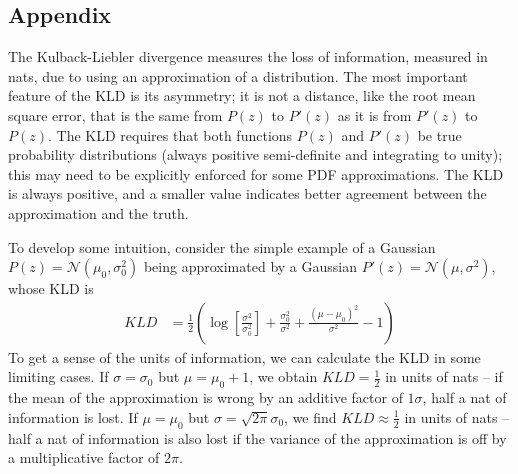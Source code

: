 \documentclass[\docopts]{\docclass}
\begin{document}
\subsection*{Appendix}
\label{sec:kld}

The Kulback-Liebler divergence measures the loss of information, measured in nats, due to using an
approximation of a distribution.  The most important feature of the KLD is its
asymmetry; it is not a distance, like the root mean square error, that is the
same from $P(z)$ to $P'(z)$ as it is from $P'(z)$ to $P(z)$.
The KLD requires that both functions $P(z)$ and $P'(z)$ be
true probability distributions (always positive semi-definite and integrating to
unity); this may need to be explicitly enforced for
some PDF approximations.  The KLD is always
positive, and a smaller value indicates better agreement between the
approximation and the truth.

To develop some intuition, consider the simple example of a Gaussian
$P(z)=\mathcal{N}(\mu_{0}, \sigma_{0}^{2})$ being approximated by a Gaussian
$P'(z)=\mathcal{N}(\mu, \sigma^{2})$, whose KLD is
\begin{align}
  \label{eq:gaussian}
  KLD &= \frac{1}{2}\left(\log\left[\frac{\sigma^{2}}{\sigma_{0}^{2}}\right] +
\frac{\sigma_{0}^{2}}{\sigma^{2}} + \frac{(\mu-\mu_{0})^{2}}{\sigma^{2}} -
1\right)
\end{align}
To get a sense of the units of information, we can calculate the KLD in some
limiting cases.  If $\sigma=\sigma_{0}$ but $\mu=\mu_{0}+1$, we obtain
$KLD=\frac{1}{2}$ in units of nats -- if the mean of the approximation is wrong
by an additive factor of $1\sigma$, half a nat of information is lost.  If
$\mu=\mu_{0}$ but $\sigma=\sqrt{2\pi}\sigma_{0}$, we find
$KLD\approx\frac{1}{2}$ in units of nats -- half a nat of information is also
lost if the variance of the approximation is off by a multiplicative factor of
$2\pi$.
\end{document}

